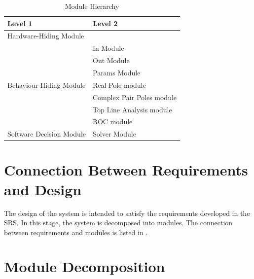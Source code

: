 \documentclass[12pt, titlepage]{article}
\begin{document}
\begin{table}[!ht]
\centering
\begin{tabular}{p{} p{}}
\toprule
\textbf{Level 1} & \textbf{Level 2}\\
\midrule

\multirow{1}{0.3\textwidth}{Hardware-Hiding Module} & \\

\midrule

\multirow{7}{0.3\textwidth}{Behaviour-Hiding Module}
  & In Module\\
  & Out Module \\
  & Params Module\\
  & Real Pole module\\
  & Complex Pair Poles module\\ 
  & Top Line Analysis module\\
  & ROC module\\
\midrule

{Software Decision Module} & Solver Module\\
\bottomrule

\end{tabular}
\caption{Module Hierarchy}
\label{tb:module}
\end{table}

\section{Connection Between Requirements and Design} \label{SecConnection}

The design of the system is intended to satisfy the requirements developed in
the SRS. In this stage, the system is decomposed into modules. The connection
between requirements and modules is listed in .


\section{Module Decomposition} \label{SecMD}
\end{document}
